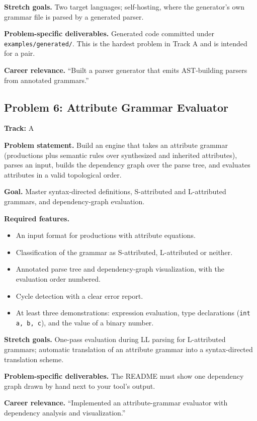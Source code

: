 \documentclass[11pt,a4paper]{article}
\newcommand{\fld}[1]{\par\smallskip\textbf{\color{accent}#1}\quad}
\newcommand{\meta}[1]{%
  \begin{tcolorbox}[colback=softbg,colframe=softbg,boxsep=2pt,left=4pt,right=4pt,top=2pt,bottom=2pt,arc=2pt]
  \small\textbf{Track:} #1
  \end{tcolorbox}}
\begin{document}
\fld{Stretch goals.} Two target languages; self-hosting, where the generator's own grammar file is
parsed by a generated parser.

\fld{Problem-specific deliverables.} Generated code committed under \texttt{examples/generated/}.
This is the hardest problem in Track A and is intended for a pair.

\fld{Career relevance.} ``Built a parser generator that emits AST-building parsers from annotated grammars.''

\subsection{Problem 6: Attribute Grammar Evaluator}
\meta{A}

\fld{Problem statement.} Build an engine that takes an attribute grammar (productions plus semantic
rules over synthesized and inherited attributes), parses an input, builds the dependency graph over
the parse tree, and evaluates attributes in a valid topological order.

\fld{Goal.} Master syntax-directed definitions, S-attributed and L-attributed grammars, and
dependency-graph evaluation.

\fld{Required features.}
\begin{itemize}
  \item An input format for productions with attribute equations.
  \item Classification of the grammar as S-attributed, L-attributed or neither.
  \item Annotated parse tree and dependency-graph visualization, with the evaluation order numbered.
  \item Cycle detection with a clear error report.
  \item At least three demonstrations: expression evaluation, type declarations (\texttt{int a, b, c}), and the value of a binary number.
\end{itemize}

\fld{Stretch goals.} One-pass evaluation during LL parsing for L-attributed grammars; automatic
translation of an attribute grammar into a syntax-directed translation scheme.

\fld{Problem-specific deliverables.} The README must show one dependency graph drawn by hand next to your tool's output.

\fld{Career relevance.} ``Implemented an attribute-grammar evaluator with dependency analysis and visualization.''
\end{document}
